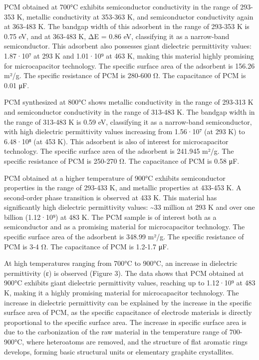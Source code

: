 \begin{multicols}{2}
PCM obtained at 700°C exhibits semiconductor conductivity in the range
of 293-353 K, metallic conductivity at 353-363 K, and semiconductor
conductivity again at 363-483 K. The bandgap width of this adsorbent in
the range of 293-353 K is 0.75 eV, and at 363-483 K, ΔE = 0.86 eV,
classifying it as a narrow-band semiconductor. This adsorbent also
possesses giant dielectric permittivity values: 1.87·10⁷ at 293 K and
1.01·10⁹ at 463 K, making this material highly promising for
microcapacitor technology. The specific surface area of the adsorbent is
156.26 m²/g. The specific resistance of PCM is 280-600 Ω. The
capacitance of PCM is 0.01 μF.

PCM synthesized at 800°C shows metallic conductivity in the range of
293-313 K and semiconductor conductivity in the range of 313-483 K. The
bandgap width in the range of 313-483 K is 0.59 eV, classifying it as a
narrow-band semiconductor, with high dielectric permittivity values
increasing from 1.56·10⁷ (at 293 K) to 6.48·10⁸ (at 453 K). This
adsorbent is also of interest for microcapacitor technology. The
specific surface area of the adsorbent is 241.945 m²/g. The specific
resistance of PCM is 250-270 Ω. The capacitance of PCM is 0.58 μF.

PCM obtained at a higher temperature of 900°C exhibits semiconductor
properties in the range of 293-433 K, and metallic properties at 433-453
K. A second-order phase transition is observed at 433 K. This material
has significantly high dielectric permittivity values: \textasciitilde33
million at 293 K and over one billion (1.12·10⁹) at 483 K. The PCM
sample is of interest both as a semiconductor and as a promising
material for microcapacitor technology. The specific surface area of the
adsorbent is 348.99 m²/g. The specific resistance of PCM is 3-4 Ω. The
capacitance of PCM is 1.2-1.7 μF.

At high temperatures ranging from 700°C to 900°C, an increase in
dielectric permittivity (ε) is observed (Figure 3). The data shows that
PCM obtained at 900°C exhibits giant dielectric permittivity values,
reaching up to 1.12·10⁹ at 483 K, making it a highly promising material
for microcapacitor technology. The increase in dielectric permittivity
can be explained by the increase in the specific surface area of PCM, as
the specific capacitance of electrode materials is directly proportional
to the specific surface area. The increase in specific surface area is
due to the carbonization of the raw material in the temperature range of
700-900°C, where heteroatoms are removed, and the structure of flat
aromatic rings develops, forming basic structural units or elementary
graphite crystallites.
\end{multicols}

